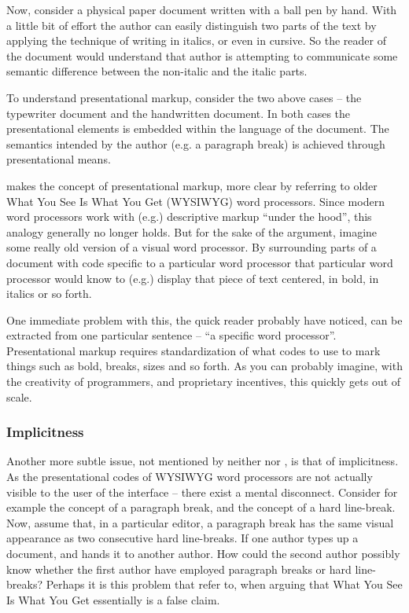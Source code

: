 \documentclass{scrreprt}
\begin{document}
Now, consider a physical paper document written with a ball pen by hand. With a little bit of effort the author can easily distinguish two parts of the text by applying the technique of writing in italics, or even in cursive. So the reader of the document would understand that author is attempting to communicate some semantic difference between the non-italic and the italic parts.

To understand presentational markup, consider the two above cases -- the typewriter document and the handwritten document. In both cases the presentational elements is embedded within the language of the document. The semantics intended by the author (e.g. a paragraph break) is achieved through presentational means.

\citet{bray} makes the concept of presentational markup, more clear by referring to older What You See Is What You Get (WYSIWYG) word processors. Since modern word processors work with (e.g.) descriptive markup ``under the hood'', this analogy generally no longer holds. But for the sake of the argument, imagine some really old version of a visual word processor. By surrounding parts of a document with code specific to a particular word processor that particular word processor would know to (e.g.) display that piece of text centered, in bold, in italics or so forth.

One immediate problem with this, the quick reader probably have noticed, can be extracted from one particular sentence -- ``a specific word processor''. Presentational markup requires standardization of what codes to use to mark things such as bold, breaks, sizes and so forth. As you can probably imagine, with the creativity of programmers, and proprietary incentives, this quickly gets out of scale.

\subsubsection{Implicitness}
Another more subtle issue, not mentioned by neither \citet{coombs} nor \citet{bray}, is that of implicitness. As the presentational codes of WYSIWYG word processors are not actually visible to the user of the interface -- there exist a mental disconnect. Consider for example the concept of a paragraph break, and the concept of a hard line-break. Now, assume that, in a particular editor, a paragraph break has the same visual appearance as two consecutive hard line-breaks. If one author types up a document, and hands it to another author. How could the second author possibly know whether the first author have employed paragraph breaks or hard line-breaks? Perhaps it is this problem that \citet{bray} refer to, when arguing that What You See Is What You Get essentially is a false claim.
\end{document}
